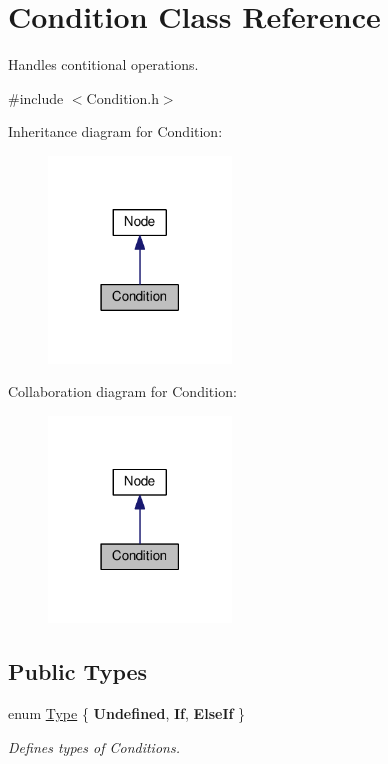 \hypertarget{classCondition}{}\section{Condition Class Reference}
\label{classCondition}


Handles contitional operations.  




{\ttfamily \#include $<$Condition.\+h$>$}



Inheritance diagram for Condition\+:
\nopagebreak
\begin{figure}[H]
\begin{center}
\leavevmode
\includegraphics[width=138pt]{classCondition__inherit__graph}
\end{center}
\end{figure}


Collaboration diagram for Condition\+:
\nopagebreak
\begin{figure}[H]
\begin{center}
\leavevmode
\includegraphics[width=138pt]{classCondition__coll__graph}
\end{center}
\end{figure}
\subsection*{Public Types}
\begin{DoxyCompactItemize}
\item 
\hypertarget{classCondition_a3eed4b7ef94da5dda4a3353cffa8266e}{}enum \hyperlink{classCondition_a3eed4b7ef94da5dda4a3353cffa8266e}{Type} \{ {\bfseries Undefined}, 
{\bfseries If}, 
{\bfseries Else\+If}
 \}\label{classCondition_a3eed4b7ef94da5dda4a3353cffa8266e}

\begin{DoxyCompactList}\small\item\em Defines types of Conditions. \end{DoxyCompactList}\end{DoxyCompactItemize}
